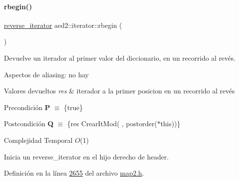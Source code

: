 \mbox{\label{classaed2_1_1iterator_a296638725dce2fc10316d18563eb3131_a296638725dce2fc10316d18563eb3131}} 
\paragraph{\texorpdfstring{rbegin()}{rbegin()}\hspace{0.1cm}{\footnotesize\ttfamily [1/2]}}
{\footnotesize\ttfamily \hyperlink{classaed2_1_1iterator_a07b2c0fa31611e03cd019b290acd6d80_a07b2c0fa31611e03cd019b290acd6d80}{reverse\+\_\+iterator} aed2\+::iterator\+::rbegin (\begin{DoxyParamCaption}{ }\end{DoxyParamCaption})\hspace{0.3cm}{\ttfamily [inline]}}



Devuelve un iterador al primer valor del diccionario, en un recorrido al revés. 

\begin{DoxyParagraph}{Aspectos de aliasing\+:}
no hay
\end{DoxyParagraph}

\begin{DoxyRetVals}{Valores devueltos}
{\em res} & iterador a la primer posicion en un recorrido al revés\\
\hline
\end{DoxyRetVals}
\begin{DoxyPrecond}{Precondición}
{\bfseries P} $\equiv$ \{true\} 
\end{DoxyPrecond}
\begin{DoxyPostcond}{Postcondición}
{\bfseries Q} $\equiv$ \{res  Crear\+It\+Mod(  , postorder($\ast$this))\}
\end{DoxyPostcond}

\begin{DoxyDescription}
\item[Complejidad Temporal]$O$(1)
\end{DoxyDescription}

Inicia un reverse\+\_\+iterator en el hijo derecho de header. 

Definición en la línea \hyperlink{map2_8h_source_l02655}{2655} del archivo \hyperlink{map2_8h_source}{map2.\+h}.

\mbox{\label{classaed2_1_1iterator_a633182fba99ef1a9f10f7bb836f990e0_a633182fba99ef1a9f10f7bb836f990e0}} 
